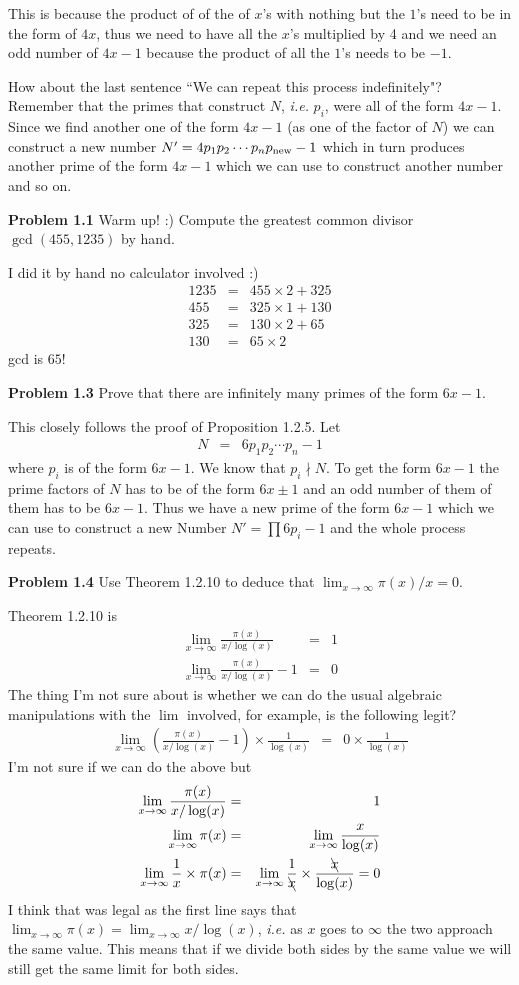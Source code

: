 \documentclass[aps,preprint,preprintnumbers,nofootinbib,showpacs,prd]{revtex4-1}
\newcommand{\ie}{{\it i.e.} }
\newcommand{\nbea}{\begin{eqnarray*}}
\newcommand{\neea}{\end{eqnarray*}}
\begin{document}
This is because the product of of the of $x$'s with nothing but the $1$'s need to be in the form of $4x$, thus we need to have all the $x$'s multiplied by 4 and we need an odd number of $4x-1$ because the product of all the $1$'s needs to be $-1$.

How about the last sentence ``We can repeat this process indefinitely"? Remember that the primes that construct $N$, \ie $p_i$, were all of the form $4x-1$. Since we find another one of the form $4x-1$ (as one of the factor of $N$) we can construct a new number $N' = 4 p_1 p_2 \cdots p_n p_{\rm new} - 1$ which in turn produces another prime of the form $4x-1$ which we can use to construct another number and so on.

{\bf Problem 1.1} Warm up! :) Compute the greatest common divisor $\gcd(455,1235)$ by hand.

I did it by hand no calculator involved :)
%
\nbea
1235 & = & 455 \times 2 + 325 \\
455 & = & 325 \times 1 + 130 \\
325 & = & 130 \times 2 + 65 \\
130 & = & 65 \times 2
\neea
%
gcd is $65$!

{\bf Problem 1.3} Prove that there are infinitely many primes of the form $6x - 1$.

This closely follows the proof of Proposition 1.2.5. Let
%
\nbea
N & = & 6 p_1 p_2 \cdots p_n - 1
\neea
%
where $p_i$ is of the form $6x-1$. We know that $p_i \nmid N$. To get the form $6x-1$ the prime factors of $N$ has to be of the form $6x \pm 1$ and an odd number of them of them has to be $6x-1$. Thus we have a new prime of the form $6x-1$ which we can use to construct a new Number $N' = \prod 6 p_i - 1$ and the whole process repeats.

{\bf Problem 1.4} Use Theorem 1.2.10 to deduce that $\lim_{x \to \infty} \pi(x)/x = 0$.

Theorem 1.2.10 is
%
\nbea
\lim_{x \to \infty} \frac{\pi(x)}{x / \log(x)} & = & 1 \\
\lim_{x \to \infty} \frac{\pi(x)}{x / \log(x)} - 1 & = & 0
\neea
%
The thing I'm not sure about is whether we can do the usual algebraic manipulations with the $\lim$ involved, for example, is the following legit?
%
\nbea
\lim_{x \to \infty} \left ( \frac{\pi(x)}{x / \log(x)} - 1 \right ) \times \frac{1}{\log(x)} & = & 0 \times \frac{1}{\log(x)}
\neea
%
I'm not sure if we can do the above but 
%
\nbea
\lim_{x \to \infty} \frac{\pi(x)}{x / \log(x)} & = & 1 \\
\lim_{x \to \infty} \pi(x) & = & \lim_{x \to \infty} \frac{x}{\log(x)} \\
\lim_{x \to \infty} \frac{1}{x} \times \pi(x) & = & \lim_{x \to \infty} \frac{1}{\bcancel{x}} \times\frac{\bcancel{x}}{\log(x)} = 0
\neea
%
I think that was legal as the first line says that $\lim_{x \to \infty} \pi(x) = \lim_{x \to \infty} x / \log(x)$, \ie as $x$ goes to $\infty$ the two approach the same value. This means that if we divide both sides by the same value we will still get the same limit for both sides.
\end{document}
